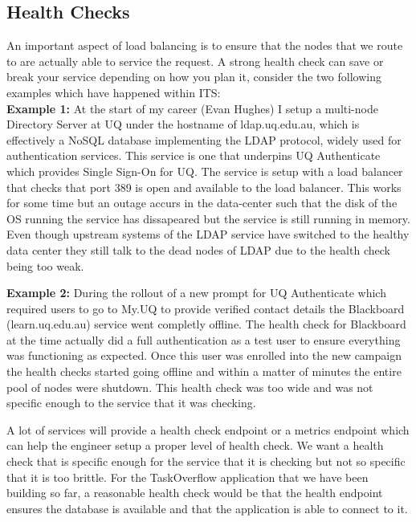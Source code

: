 \documentclass{csse4400}
\begin{document}
\subsection{Health Checks}

An important aspect of load balancing is to ensure that the nodes that we route to are actually able to service the request. A strong health check can save or break your service depending on how you plan it, consider the two following examples which have happened within ITS:\\

\textbf{Example 1:} At the start of my career (Evan Hughes) I setup a multi-node Directory Server at UQ under the hostname of ldap.uq.edu.au, which is effectively a NoSQL database implementing the LDAP protocol, widely used for authentication services. This service is one that underpins UQ Authenticate which provides Single Sign-On for UQ. The service is setup with a load balancer that checks that port 389 is open and available to the load balancer.  This works for some time but an outage accurs in the data-center such that the disk of the OS running the service has dissapeared but the service is still running in memory. Even though upstream systems of the LDAP service have switched to the healthy data center they still talk to the dead nodes of LDAP due to the health check being too weak.\\


\textbf{Example 2:} During the rollout of a new prompt for UQ Authenticate which required users to go to My.UQ to provide verified contact details the Blackboard (learn.uq.edu.au) service went completly offline. The health check for Blackboard at the time actually did a full authentication as a test user to ensure everything was functioning as expected. Once this user was enrolled into the new campaign the health checks started going offline and within a matter of minutes the entire pool of nodes were shutdown. This health check was too wide and was not specific enough to the service that it was checking.\\


A lot of services will provide a health check endpoint or a metrics endpoint which can help the engineer setup a proper level of health check. We want a health check that is specific enough for the service that it is checking but not so specific that it is too brittle. For the TaskOverflow application that we have been building so far, a reasonable health check would be that the health endpoint ensures the database is available and that the application is able to connect to it.
\end{document}
